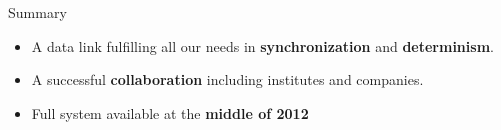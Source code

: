 \documentclass[xcolor=dvipsnames]{beamer}
\begin{document}
\begin{frame}{Summary}
  \begin{itemize}
  \item
    A data link fulfilling all our needs in \textbf{synchronization} and \textbf{determinism}.
  \item
    A successful \textbf{collaboration} including institutes and companies.
  \item
    Full system available at the \textbf{middle of 2012}
  \end{itemize}
\end{frame}
\end{document}
